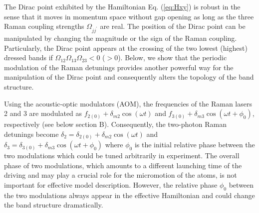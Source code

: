 \documentclass[aps,prl,twocolumn,floatfix,reprint]{revtex4}
\begin{document}
\begin{widetext}
The Dirac point exhibited by the Hamiltonian Eq. (\ref{eq:Hxy}) is robust in
the sense that it moves in momentum space without gap opening as long as the
three Raman coupling strengths $\Omega _{jj^{\prime }}$ are real. The
position of the Dirac point can be manipulated by changing the magnitude or
the sign of the Raman coupling. Particularly, the Dirac point appears at the
crossing of the two lowest (highest) dressed bands if $\Omega _{12}\Omega
_{13}\Omega _{23}<0$ ($>0$). Below, we show that the periodic modulation of
the Raman detunings provides another powerful way for the manipulation of
the Dirac point and consequently alters the topology of the band structure.

Using the acoustic-optic modulators (AOM), the frequencies of the Raman
lasers 2 and 3 are modulated as $f_{2(0)}+\delta _{m2}\cos (\omega t)$ and $%
f_{3(0)}+\delta _{m3}\cos (\omega t+\phi _{0})$, respectively (see below
section B). Consequently, the two-photon Raman detunings become $\delta
_{2}=\delta _{2(0)}+\delta _{m2}\cos (\omega t)$ and $\delta _{3}=\delta
_{3(0)}+\delta _{m3}\cos (\omega t+\phi _{0})$ where $\phi _{0}$ is the
initial relative phase between the two modulations which could be tuned
arbitrarily in experiment. The overall phase of two modulations, which
amounts to a different launching time of the driving and may play a crucial
role for the micromotion of the atoms, is not important for effective model
description. However, the relative phase $\phi _{0}$ between the two
modulations always appear in the effective Hamiltonian and could change the
band structure dramatically.


\end{widetext}
\end{document}
